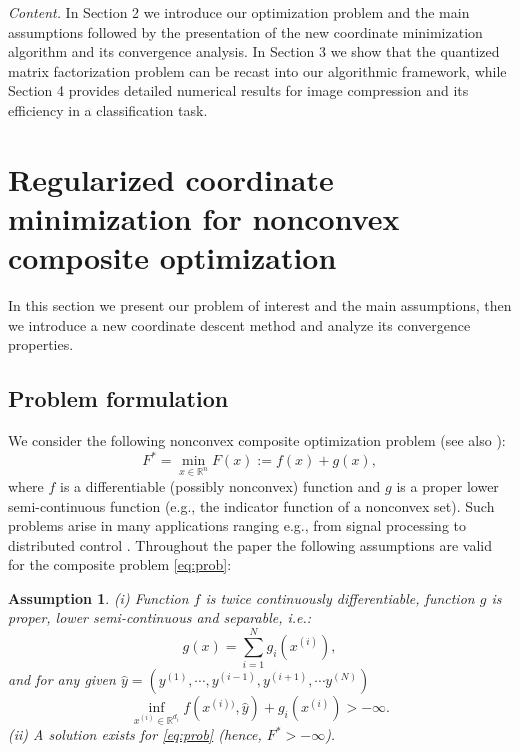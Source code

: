 \documentclass[lettersize,journal]{IEEEtran}
\newtheorem{assum}{Assumption}
\begin{document}
\medskip

\noindent \textit{Content.} In Section 2 we introduce our optimization problem and the main assumptions followed  by the presentation of the new coordinate minimization algorithm and its convergence analysis. In Section 3 we show that  the quantized matrix factorization problem can be recast into our algorithmic framework, while Section 4 provides detailed numerical results for image compression  and its efficiency in a classification task.     

	


\section{Regularized coordinate minimization for nonconvex composite optimization}
\noindent In this section we present our problem of interest and the main assumptions, then we introduce a new coordinate descent method and analyze its convergence properties. 

\subsection{Problem formulation}
\noindent We consider the following nonconvex composite optimization problem (see also \cite{Teb:14, NecCho:24}): 
\begin{equation} 
\label{eq:prob}
F^* = \min_{x \in \mathbb{R}^n} F(x):= f(x) + g(x),
\end{equation}
where  $f$ is a differentiable (possibly nonconvex) function and $g$ is a proper lower semi-continuous function (e.g., the indicator function of a nonconvex set). Such problems arise in many applications ranging e.g., from signal processing   \cite{Hou:15} to distributed control \cite{NecCli:13}.  Throughout the paper the following assumptions are valid for the  composite  problem \eqref{eq:prob}:

\begin{assum} 
\label{ass1}
(i) Function  $f$ is twice continuously differentiable, function $g$ is proper, lower semi-continuous and separable, i.e.:
\[  g(x) = \sum_{i=1}^N g_i(x^{(i)}),    \]
and for any given $\hat y = (y^{(1)},\cdots, y^{(i-1)},  y^{(i+1)},\cdots y^{(N)})$ 
\[ \inf_{x^{(i)} \in \mathbb{R}^{d_i}}  f(x^{(i))}, \hat y) + g_i (x^{(i)}) > - \infty. \]  
(ii) A solution exists for \eqref{eq:prob}  (hence,   $F^* > -\infty$).
\end{assum}
   
\end{document}
